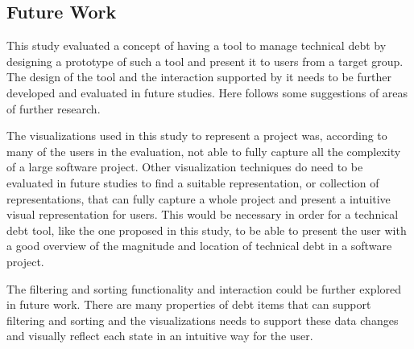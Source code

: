 \subsection{Future Work}

This study evaluated a concept of having a tool to manage technical debt by designing a prototype of such a tool and present it to users from a target group.
The design of the tool and the interaction supported by it needs to be further developed and evaluated in future studies. Here follows some suggestions of areas of further research.

The visualizations used in this study to represent a project was, according to many of the users in the evaluation, not able to fully capture all the complexity of a large software project.
Other visualization techniques do need to be evaluated in future studies to find a suitable representation, or collection of representations, that can fully capture a whole project and present a intuitive visual representation for users.
This would be necessary in order for a technical debt tool, like the one proposed in this study, to be able to present the user with a good overview of the magnitude and location of technical debt in a software project.

The filtering and sorting functionality and interaction could be further explored in future work.
There are many properties of debt items that can support filtering and sorting and the visualizations needs to support these data changes and visually reflect each state in an intuitive way for the user.